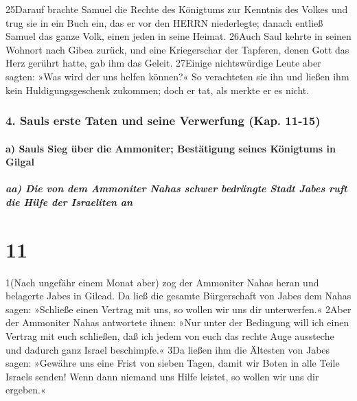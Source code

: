 25Darauf brachte Samuel die Rechte des Königtums zur Kenntnis des Volkes
und trug sie in ein Buch ein, das er vor den HERRN niederlegte; danach
entließ Samuel das ganze Volk, einen jeden in seine Heimat. 26Auch Saul
kehrte in seinen Wohnort nach Gibea zurück, und eine Kriegerschar der
Tapferen, denen Gott das Herz gerührt hatte, gab ihm das Geleit.
27Einige nichtswürdige Leute aber sagten: »Was wird der uns helfen
können?« So verachteten sie ihn und ließen ihm kein Huldigungsgeschenk
zukommen; doch er tat, als merkte er es nicht.

\hypertarget{sauls-erste-taten-und-seine-verwerfung-kap.-11-15}{%
\subsubsection{4. Sauls erste Taten und seine Verwerfung (Kap.
11-15)}\label{sauls-erste-taten-und-seine-verwerfung-kap.-11-15}}

\hypertarget{a-sauls-sieg-uxfcber-die-ammoniter-bestuxe4tigung-seines-kuxf6nigtums-in-gilgal}{%
\paragraph{a) Sauls Sieg über die Ammoniter; Bestätigung seines
Königtums in
Gilgal}\label{a-sauls-sieg-uxfcber-die-ammoniter-bestuxe4tigung-seines-kuxf6nigtums-in-gilgal}}

\hypertarget{aa-die-von-dem-ammoniter-nahas-schwer-bedruxe4ngte-stadt-jabes-ruft-die-hilfe-der-israeliten-an}{%
\subparagraph{aa) Die von dem Ammoniter Nahas schwer bedrängte Stadt
Jabes ruft die Hilfe der Israeliten
an}\label{aa-die-von-dem-ammoniter-nahas-schwer-bedruxe4ngte-stadt-jabes-ruft-die-hilfe-der-israeliten-an}}

\hypertarget{section-10}{%
\section{11}\label{section-10}}

1(Nach ungefähr einem Monat aber) zog der Ammoniter Nahas heran und
belagerte Jabes in Gilead. Da ließ die gesamte Bürgerschaft von Jabes
dem Nahas sagen: »Schließe einen Vertrag mit uns, so wollen wir uns dir
unterwerfen.« 2Aber der Ammoniter Nahas antwortete ihnen: »Nur unter der
Bedingung will ich einen Vertrag mit euch schließen, daß ich jedem von
euch das rechte Auge aussteche und dadurch ganz Israel beschimpfe.« 3Da
ließen ihm die Ältesten von Jabes sagen: »Gewähre uns eine Frist von
sieben Tagen, damit wir Boten in alle Teile Israels senden! Wenn dann
niemand uns Hilfe leistet, so wollen wir uns dir ergeben.«

